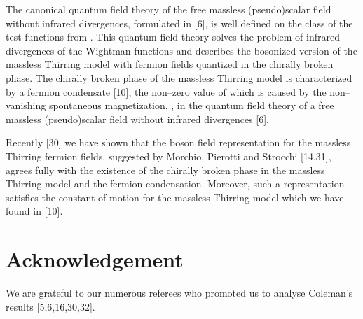 \documentclass[a4paper,12pt] {article}
\begin{document}
The canonical quantum field theory of the free massless (pseudo)scalar
field \coordHE{} without infrared divergences, formulated in [6],
is well defined on the class of the test functions from \coordHE{}. This quantum field theory solves the problem
of infrared divergences of the Wightman functions and describes the
bosonized version of the massless Thirring model with fermion fields
quantized in the chirally broken phase. The chirally broken phase of
the massless Thirring model is characterized by a fermion condensate
[10], the non--zero value of which is caused by the non--vanishing
spontaneous magnetization, \coordHE{}, in the quantum field theory
of a free massless (pseudo)scalar field without infrared divergences
[6].

Recently [30] we have shown that the boson field representation for
the massless Thirring fermion fields, suggested by Morchio, Pierotti
and Strocchi [14,31], agrees fully with the existence of the chirally
broken phase in the massless Thirring model and the fermion
condensation. Moreover, such a representation satisfies the constant
of motion for the massless Thirring model which we have found in [10].

\section*{Acknowledgement}

\hspace{0.2in} We are grateful to our numerous referees who promoted
us to analyse Coleman's results [5,6,16,30,32].

\newpage
\end{document}
